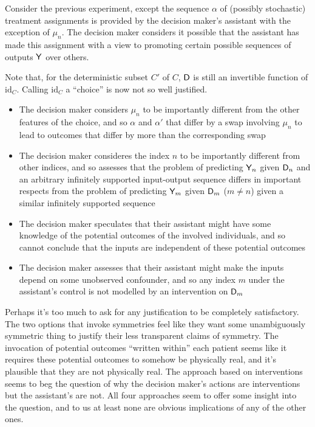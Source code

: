 \begin{example}\label{ex:bad_randomised_experiment}
Consider the previous experiment, except the sequence $\alpha$ of (possibly stochastic) treatment assignments is provided by the decision maker's assistant with the exception of $\mu_n$. The decision maker considers it possible that the assistant has made this assignment with a view to promoting certain possible sequences of outputs $\mathsf{Y}$ over others.

Note that, for the deterministic subset $C'$ of $C$, $\mathsf{D}$ is still an invertible function of $\text{id}_C$. Calling $\text{id}_C$ a ``choice'' is now not so well justified.

\begin{itemize}
    \item The decision maker considers $\mu_n$ to be importantly different from the other features of the choice, and so $\alpha$ and $\alpha'$ that differ by a swap involving $\mu_n$ to lead to outcomes that differ by more than the corresponding swap
    \item The decision maker consideres the index $n$ to be importantly different from other indices, and so assesses that the problem of predicting $\mathsf{Y}_n$ given $\mathsf{D}_n$ and an arbitrary infinitely supported input-output sequence differs in important respects from the problem of predicting $\mathsf{Y}_m$ given $\mathsf{D}_m$ ($m\neq n$) given a similar infinitely supported sequence
    \item The decision maker speculates that their assistant might have some knowledge of the potential outcomes of the involved individuals, and so cannot conclude that the inputs are independent of these potential outcomes
    \item The decision maker assesses that their assistant might make the inputs depend on some unobserved confounder, and so any index $m$ under the assistant's control is not modelled by an intervention on $\mathsf{D}_m$
\end{itemize}
\end{example}

Perhaps it's too much to ask for any justification to be completely satisfactory. The two options that invoke symmetries feel like they want some unambiguously symmetric thing to justify their less transparent claims of symmetry. The invocation of potential outcomes ``written within'' each patient seems like it requires these potential outcomes to somehow be physically real, and it's plausible that they are not physically real. The approach based on interventions seems to beg the question of why the decision maker's actions are interventions but the assistant's are not. All four approaches seem to offer some insight into the question, and to us at least none are obvious implications of any of the other ones.


